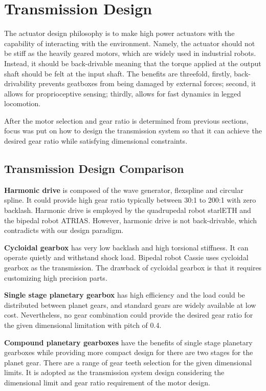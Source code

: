 
\section{\textbf{Transmission Design}}
\label{sec:transmissionDesign}

The actuator design philosophy is to make high power actuators with the capability of interacting with the environment. Namely, the actuator should not be stiff as the heavily geared motors, which are widely used in industrial robots. Instead, it should be back-drivable meaning that the torque applied at the output shaft should be felt at the input shaft. The benefits are threefold, firstly, back-drivability prevents geatboxes from being damaged by external forces; second, it allows for proprioceptive sensing\cite{Seok2012}; thirdly, allows for fast dynamics in legged locomotion.

After the motor selection and gear ratio is determined from previous sections, focus was put on how to design the transmission system so that it can achieve the desired gear ratio while satisfying dimensional constraints.

\subsection{\textbf{Transmission Design Comparison}}
\label{sec:transmissionComparison}

\textbf{Harmonic drive} is composed of the wave generator, flexspline and circular spline. It could provide high gear ratio typically between 30:1 to 200:1 with zero backlash. Harmonic drive is employed by the quadrupedal robot starlETH\cite{Hutter2013} and the bipedal robot ATRIAS\cite{Hubicki2016}. However, harmonic drive is not back-drivable, which contradicts with our design paradigm.

\textbf{Cycloidal gearbox} has very low backlash and high torsional stiffness. It can operate quietly and withstand shock load. Bipedal robot Cassie uses cycloidal gearbox as the transmission. The drawback of cycloidal gearbox is that it requires customizing high precision parts.

\textbf{Single stage planetary gearbox} has high efficiency and the load could be distributed between planet gears, and standard gears are widely available at low cost. Nevertheless, no gear combination could provide the desired gear ratio for the given dimensional limitation with pitch of 0.4.

\textbf{Compound planetary gearboxes} have the benefits of single stage planetary gearboxes while providing more compact design for there are two stages for the planet gear. There are a range of gear teeth selection for the given dimensional limits. It is adopted as the transmission system design considering the dimensional limit and gear ratio requirement of the motor design.

